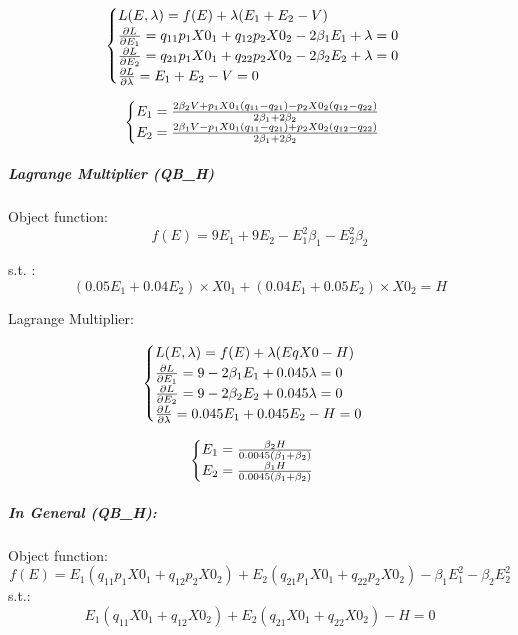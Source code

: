 \documentclass[
]{article}
\begin{document}
\[\begin{cases}
L(E, \lambda) = f(E) + \lambda(E_1 + E_2 - V)\\
{\partial L \over \partial E_1} = q_{11}p_1X0_1+q_{12}p_2X0_2-2\beta_1E_1 + \lambda=0\\
{\partial L \over \partial E_2} = q_{21}p_1X0_1+q_{22}p_2X0_2-2\beta_2E_2 + \lambda=0\\
{\partial L \over \partial \lambda} = E_1+E_2-V=0\\
\end{cases}
\]

\[\begin{cases}
E_1 = {2\beta_2V+p_1X0_1(q_{11}-q_{21})-p_2X0_2(q_{12}-q_{22})\over 2\beta_1+2\beta_2}\\
E_2 = {2\beta_1V-p_1X0_1(q_{11}-q_{21})+p_2X0_2(q_{12}-q_{22})\over 2\beta_1+2\beta_2}
\end{cases}
\]

\hypertarget{lagrange-multiplier-qb_h}{%
\subparagraph{\texorpdfstring{\textbf{Lagrange Multiplier
(QB\_H)}}{Lagrange Multiplier (QB\_H)}}\label{lagrange-multiplier-qb_h}}

Object function: \[
f(E) = 9E_1+9E_2-E_1^2{\beta_1} - E_2^2{\beta_2}
\]

s.t. : \[
(0.05E_1 + 0.04E_2) \times X0_1 + (0.04E_1 + 0.05E_2) \times X0_2 = H
\]

Lagrange Multiplier:

\[\begin{cases}
L(E, \lambda) = f(E) + \lambda(EqX0 - H)\\
{\partial L \over \partial E_1} = 9-2\beta_1E_1+0.045\lambda=0\\
{\partial L \over \partial E_2} = 9-2\beta_2E_2+0.045\lambda=0\\
{\partial L \over \partial \lambda} = 0.045E_1+0.045E_2-H=0\\
\end{cases}
\]

\[\begin{cases}
E_1 = {\beta_2H\over 0.0045(\beta_1+\beta_2)} \\
E_2 = {\beta_1H\over 0.0045(\beta_1+\beta_2)}\\
\end{cases}
\]

\hypertarget{in-general-qb_h}{%
\subparagraph{\texorpdfstring{\textbf{In General
(QB\_H):}}{In General (QB\_H):}}\label{in-general-qb_h}}

Object function: \[
f(E) = E_1(q_{11}p_1X0_1+q_{12}p_2X0_2) + E_2(q_{21}p_1X0_1+q_{22}p_2X0_2) - \beta_1E_1^2 - \beta_2E_2^2
\] s.t.: \[
E_1(q_{11}X0_1+q_{12}X0_2) + E_2(q_{21}X0_1+q_{22}X0_2) - H = 0
\]
\end{document}
